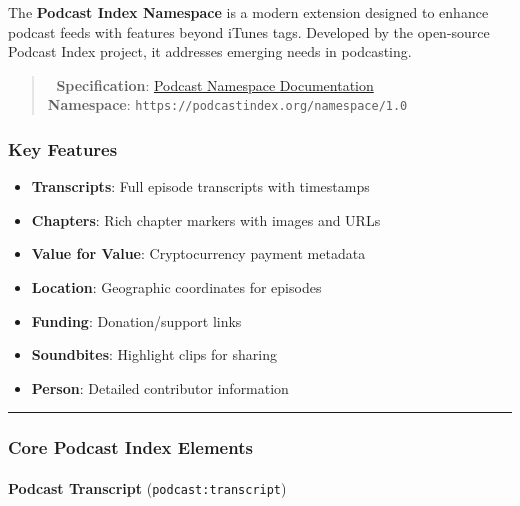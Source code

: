 \documentclass[
  letterpaper,
  DIV=11,
  numbers=noendperiod]{scrartcl}
\makeatletter
\let\oldparagraph\paragraph
\renewcommand{\paragraph}{
    \@ifstar
      \xxxParagraphStar
      \xxxParagraphNoStar
  }
\newcommand{\xxxParagraphStar}[1]{\oldparagraph*{#1}\mbox{}}
\newcommand{\xxxParagraphNoStar}[1]{\oldparagraph{#1}\mbox{}}
\providecommand{\tightlist}{%
  \setlength{\itemsep}{0pt}\setlength{\parskip}{0pt}}\usepackage{longtable,booktabs,array}
\makeatother
\begin{document}
The \textbf{Podcast Index Namespace} is a modern extension designed to
enhance podcast feeds with features beyond iTunes tags. Developed by the
open-source Podcast Index project, it addresses emerging needs in
podcasting.

\begin{quote}
📄 \textbf{Specification}:
\href{https://github.com/Podcastindex-org/podcast-namespace/blob/main/docs/1.0.md}{Podcast
Namespace Documentation}\\
\textbf{Namespace}: \texttt{https://podcastindex.org/namespace/1.0}
\end{quote}

\subsubsection{Key Features}\label{key-features}

\begin{itemize}
\tightlist
\item
  \textbf{Transcripts}: Full episode transcripts with timestamps
\item
  \textbf{Chapters}: Rich chapter markers with images and URLs
\item
  \textbf{Value for Value}: Cryptocurrency payment metadata
\item
  \textbf{Location}: Geographic coordinates for episodes
\item
  \textbf{Funding}: Donation/support links
\item
  \textbf{Soundbites}: Highlight clips for sharing
\item
  \textbf{Person}: Detailed contributor information
\end{itemize}

\begin{center}\rule{0.5\linewidth}{0.5pt}\end{center}

\subsubsection{Core Podcast Index
Elements}\label{core-podcast-index-elements}

\paragraph{\texorpdfstring{\textbf{Podcast Transcript}
(\texttt{podcast:transcript})}{Podcast Transcript (podcast:transcript)}}\label{podcast-transcript-podcasttranscript}
\end{document}
